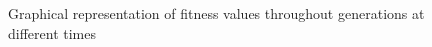 \documentclass[a4paper,10pt]{article}
\begin{document}
\begin{figure}[H!]
  \centering
  \caption{Graphical representation of fitness values throughout generations at different times}
  \label{fig:firstResults}
\end{figure}




























  
\end{document}

